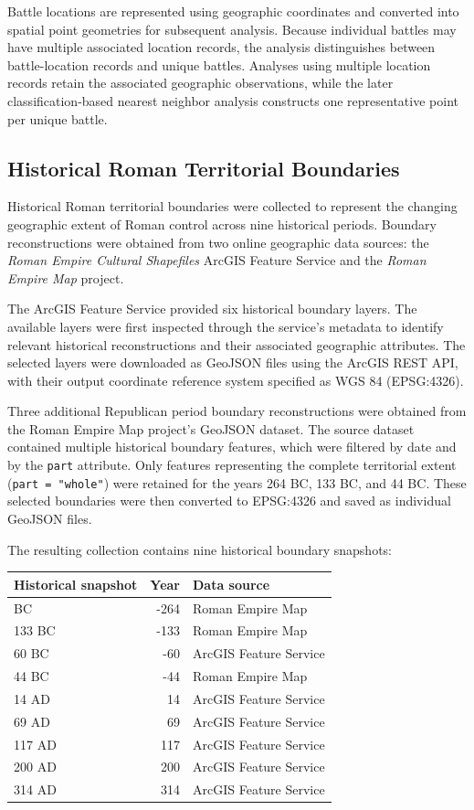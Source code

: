 \documentclass[
  letterpaper,
  DIV=11,
  numbers=noendperiod]{scrartcl}
\begin{document}
Battle locations are represented using geographic coordinates and
converted into spatial point geometries for subsequent analysis. Because
individual battles may have multiple associated location records, the
analysis distinguishes between battle-location records and unique
battles. Analyses using multiple location records retain the associated
geographic observations, while the later classification-based nearest
neighbor analysis constructs one representative point per unique battle.

\subsection{Historical Roman Territorial
Boundaries}\label{historical-roman-territorial-boundaries}

Historical Roman territorial boundaries were collected to represent the
changing geographic extent of Roman control across nine historical
periods. Boundary reconstructions were obtained from two online
geographic data sources: the \emph{Roman Empire Cultural Shapefiles}
ArcGIS Feature Service and the \emph{Roman Empire Map} project.

The ArcGIS Feature Service provided six historical boundary layers. The
available layers were first inspected through the service's metadata to
identify relevant historical reconstructions and their associated
geographic attributes. The selected layers were downloaded as GeoJSON
files using the ArcGIS REST API, with their output coordinate reference
system specified as WGS 84 (EPSG:4326).

Three additional Republican period boundary reconstructions were
obtained from the Roman Empire Map project's GeoJSON dataset. The source
dataset contained multiple historical boundary features, which were
filtered by date and by the \texttt{part} attribute. Only features
representing the complete territorial extent (\texttt{part\ =\ "whole"})
were retained for the years 264 BC, 133 BC, and 44 BC. These selected
boundaries were then converted to EPSG:4326 and saved as individual
GeoJSON files.

The resulting collection contains nine historical boundary snapshots:

\begin{longtable}[]{@{}lrl@{}}
\toprule\noalign{}
Historical snapshot & Year & Data source \\
\midrule\noalign{}
\endhead
\bottomrule\noalign{}
\endlastfoot
264 BC & -264 & Roman Empire Map \\
133 BC & -133 & Roman Empire Map \\
60 BC & -60 & ArcGIS Feature Service \\
44 BC & -44 & Roman Empire Map \\
14 AD & 14 & ArcGIS Feature Service \\
69 AD & 69 & ArcGIS Feature Service \\
117 AD & 117 & ArcGIS Feature Service \\
200 AD & 200 & ArcGIS Feature Service \\
314 AD & 314 & ArcGIS Feature Service \\
\end{longtable}
\end{document}
